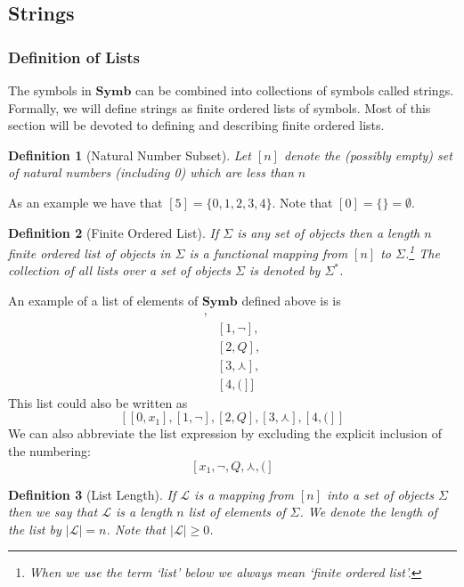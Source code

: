 \documentclass[12pt]{article}
\theoremstyle{break}
\newtheorem{definition}{Definition}[section]
\theoremstyle{break}
\theoremstyle{break}
\theoremstyle{break}
\newcommand{\mc}[1]{\mathcal{#1}}
\begin{document}
\subsection{Strings}
\subsubsection{Definition of Lists}
The symbols in $\textbf{Symb}$ can be combined into collections of symbols called strings.
Formally, we will define strings as finite ordered lists of symbols.
Most of this section will be devoted to defining and describing finite ordered lists.

\begin{definition}[Natural Number Subset]
Let $[n]$ denote the (possibly empty) set of natural numbers (including 0) which are less than $n$
\end{definition}

As an example we have that $[5] = \{0, 1, 2, 3, 4\}$.
Note that $[0] = \{\} = \emptyset$.

\begin{definition}[Finite Ordered List]
If $\Sigma$ is any set of objects then a length $n$ finite ordered list of objects in $\Sigma$ is a functional mapping from $[n]$ to $\Sigma$.\footnote{When we use the term `list' below we always mean `finite ordered list'.}  The collection of all lists over a set of objects $\Sigma$ is denoted by $\Sigma^*$.
\end{definition}


An example of a list of elements of $\textbf{Symb}$ defined above is is
\begin{align*}
[&[0, x_1],\\
&[1, \lnot],\\
&[2, Q],\\
&[3, \curlywedge],\\
&[4, (]]
\end{align*}
This list could also be written as
$$
[[0, x_1], [1, \lnot], [2, Q], [3, \curlywedge], [4, (]]
$$
We can also abbreviate the list expression by excluding the explicit inclusion of the numbering:
$$
[x_1, \lnot, Q, \curlywedge, (]
$$

\begin{definition}[List Length]
If $\mc{L}$ is a mapping from $[n]$ into a set of objects $\Sigma$ then we say that $\mc{L}$ is a length $n$ list of elements of $\Sigma$.
We denote the length of the list by $|\mc{L}| = n$.
Note that $|\mc{L}| \ge 0$.
\end{definition}
\end{document}
